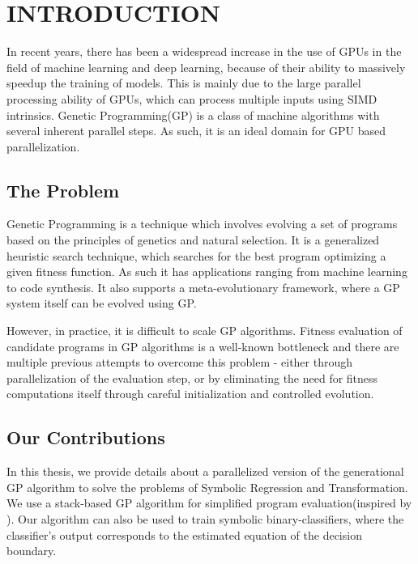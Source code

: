 \chapter{INTRODUCTION} \label{chap:intro}
In recent years, there has been a widespread increase in the use of GPUs in the field of machine learning and deep learning, because of their ability to massively speedup the training of models. This is mainly due to the large parallel processing ability of GPUs, which can process multiple inputs using SIMD intrinsics. Genetic Programming(GP) is a class of machine algorithms with several inherent parallel steps. As such, it is an ideal domain for GPU based parallelization. 

\section{The Problem}
\label{intro:problem}
Genetic  Programming is a technique which involves evolving a set of programs based on the principles of genetics and natural selection. It is a generalized heuristic search technique, which searches for the best program optimizing a given fitness function. 
As such it has applications ranging from machine learning to code synthesis\citep{Koza92}. It also supports a meta-evolutionary framework, where a GP system itself can be evolved using GP\citep{schaul2010metalearning}.

However, in practice, it is difficult to scale GP algorithms. Fitness evaluation of candidate programs in GP algorithms is a well-known bottleneck and there are multiple previous attempts to overcome this problem - either through parallelization of the evaluation step\citep{10.1007/978-3-540-71605-1_9,baeta2021tensorgp,DEAP_JMLR2012,gplearn,staats2017tensorflow}, or by eliminating the need for fitness computations itself through careful initialization and controlled evolution\citep{biles2001autonomous}.

\section{Our Contributions}
\label{intro:contrib} 
In this thesis, we provide details about a parallelized version of the generational GP algorithm to solve the problems of Symbolic Regression and Transformation. We use a stack-based GP algorithm for simplified program evaluation(inspired by \citep{perkis}). Our algorithm can also be used to train symbolic binary-classifiers, where the classifier's output corresponds to the estimated equation of the decision boundary. 

